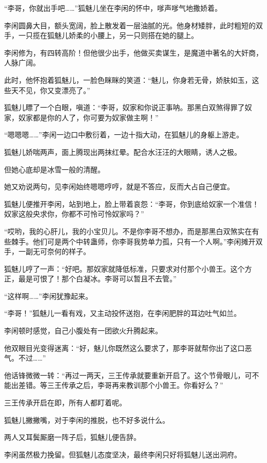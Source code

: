 
\begin{this_body}

“李哥，你就出手吧……”狐魅儿坐在李闲的怀中，嗲声嗲气地撒娇着。

李闲圆鼻大目，额头宽阔，脸上散发着一层油腻的光。他身材矮胖，此时粗短的双手，一只揽在狐魅儿娇柔的小腰上，另一只则搭在她的腿上。

李闲修为，有四转高阶！但他很少出手，他做买卖谋生，是魔道中著名的大奸商，人脉广阔。

此时，他怀抱着狐魅儿，一脸色眯眯的笑道：“魅儿，你身若无骨，娇肤如玉，这些天不见，你又变漂亮了。”

狐魅儿瞟了一个白眼，嗔道：“李哥，奴家和你说正事呐。那黑白双煞得罪了奴家，奴家都是你的人了，你可要为奴家做主啊！”

“嗯嗯嗯……”李闲一边口中敷衍着，一边十指大动，在狐魅儿的身躯上游走。

狐魅儿娇喘两声，面上腾现出两抹红晕。配合水汪汪的大眼睛，诱人之极。

但她心底却是冰雪一般的清醒。

她又劝说两句，见李闲始终嗯嗯哼哼，就是不答应，反而大占自己便宜。

狐魅儿便推开李闲，站到地上，脸上带着哀怨：“李哥，你到底给奴家一个准信！奴家这般央求你，你都不可怜可怜奴家吗？”

“哎哟，我的心肝儿，我的小宝贝儿。不是你李哥不想办，而是那黑白双煞实在有些棘手。他们可是两个中转蛊师，你李哥我势单力孤，只有一个人啊。”李闲摊开双手，一副无可奈何的样子。

狐魅儿哼了一声：“好吧。那奴家就降低标准，只要求对付那个小兽王。这个方正，最是可恨了！那个白凝冰。李哥可以暂且不去管。”

“这样啊……”李闲犹豫起来。

“李哥！”狐魅儿一看有戏，又主动投怀送抱，在李闲肥胖的耳边吐气如兰。

李闲顿时感觉，自己小腹处有一团欲火升腾起来。

他双眼目光变得迷离：“好，魅儿你既然这么要求了，那李哥就帮你出了这口恶气。不过……”

他话锋微微一转：“再过一两天，三王传承就要重新开启了。这个节骨眼儿，可不能出差错。等三王传承之后，李哥再来教训那个小兽王。你看好么？”

三王传承开启在即，所有人都盯着呢。

狐魅儿撇撇嘴，对于李闲的推脱，也不好多说什么。

两人又耳鬓厮磨一阵子后，狐魅儿便告辞。

李闲虽然极力挽留。但狐魅儿态度坚决，最终李闲只好将狐魅儿送出洞府。


\end{this_body}
